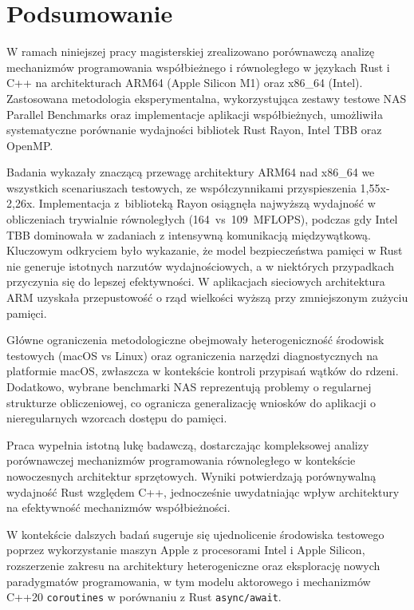 \chapter{Podsumowanie}
W ramach niniejszej pracy magisterskiej zrealizowano porównawczą analizę mechanizmów programowania współbieżnego i równoległego w językach Rust i C++ na architekturach ARM64 (Apple Silicon M1) oraz x86\_64 (Intel). Zastosowana metodologia eksperymentalna, wykorzystująca zestawy testowe NAS Parallel Benchmarks oraz implementacje aplikacji współbieżnych, umożliwiła systematyczne porównanie wydajności bibliotek Rust Rayon, Intel TBB oraz OpenMP.

Badania wykazały znaczącą przewagę architektury ARM64 nad x86\_64 we wszystkich scenariuszach testowych, ze współczynnikami przyspieszenia 1,55x-2,26x. Implementacja z~biblioteką Rayon osiągnęła najwyższą wydajność w obliczeniach trywialnie równoległych \mbox{(164 vs 109 MFLOPS)}, podczas gdy Intel TBB dominowała w zadaniach z intensywną komunikacją międzywątkową. Kluczowym odkryciem było wykazanie, że model bezpieczeństwa pamięci w Rust nie generuje istotnych narzutów wydajnościowych, a w niektórych przypadkach przyczynia się do lepszej efektywności. W aplikacjach sieciowych architektura ARM uzyskała przepustowość o rząd wielkości wyższą przy zmniejszonym zużyciu pamięci.

Główne ograniczenia metodologiczne obejmowały heterogeniczność środowisk testowych (macOS vs Linux) oraz ograniczenia narzędzi diagnostycznych na platformie macOS, zwłaszcza w kontekście kontroli przypisań wątków do rdzeni. Dodatkowo, wybrane benchmarki NAS reprezentują problemy o regularnej strukturze obliczeniowej, co ogranicza generalizację wniosków do aplikacji o nieregularnych wzorcach dostępu do pamięci.

Praca wypełnia istotną lukę badawczą, dostarczając kompleksowej analizy porównawczej mechanizmów programowania równoległego w kontekście nowoczesnych architektur sprzętowych. Wyniki potwierdzają porównywalną wydajność Rust względem C++, jednocześnie uwydatniając wpływ architektury na efektywność mechanizmów współbieżności.

W kontekście dalszych badań sugeruje się ujednolicenie środowiska testowego poprzez wykorzystanie maszyn Apple z procesorami Intel i Apple Silicon, rozszerzenie zakresu na architektury heterogeniczne oraz eksplorację nowych paradygmatów programowania, w tym modelu aktorowego i mechanizmów C++20 \texttt{coroutines} w porównaniu z Rust \texttt{async/await}.

